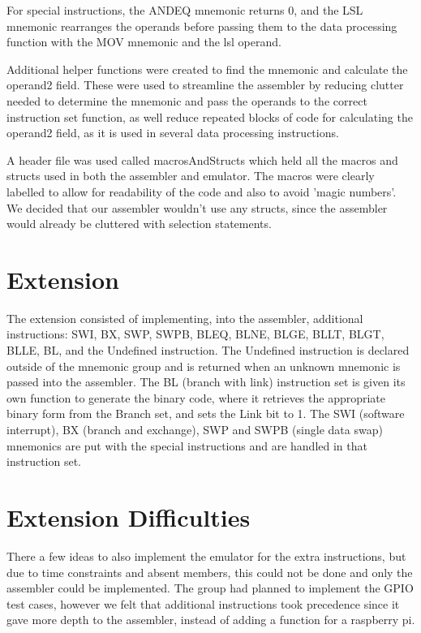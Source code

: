 \documentclass{article}
\begin{document}
For special instructions, the ANDEQ mnemonic returns 0, and the LSL mnemonic rearranges the operands before passing them to the data processing function with the MOV mnemonic and the lsl operand.

Additional helper functions were created to find the mnemonic and calculate the operand2 field. These were used to streamline the assembler by reducing clutter needed to determine the mnemonic and pass the operands to the correct instruction set function, as well reduce repeated blocks of code for calculating the operand2 field, as it is used in several data processing instructions.

A header file was used called macrosAndStructs which held all the macros and structs used in both the assembler and emulator. The macros were clearly labelled to allow for readability of the code and also to avoid 'magic numbers'. We decided that our assembler wouldn't use any structs, since the assembler would already be cluttered with selection statements.

\section*{Extension}
The extension consisted of implementing, into the assembler, additional instructions: SWI, BX, SWP, SWPB, BLEQ, BLNE, BLGE, BLLT, BLGT, BLLE, BL, and the Undefined instruction. The Undefined instruction is declared outside of the mnemonic group and is returned when an unknown mnemonic is passed into the assembler. The BL (branch with link) instruction set is given its own function to generate the binary code, where it retrieves the appropriate binary form from the Branch set, and sets the Link bit to 1. The SWI (software interrupt), BX (branch and exchange), SWP and SWPB (single data swap) mnemonics are put with the special instructions and are handled in that instruction set.

\section*{Extension Difficulties}
There a few ideas to also implement the emulator for the extra instructions, but due to time constraints and absent members, this could not be done and only the assembler could be implemented. The group had planned to implement the GPIO test cases, however we felt that additional instructions took precedence since it gave more depth to the assembler, instead of adding a function for a raspberry pi. 
\end{document}
